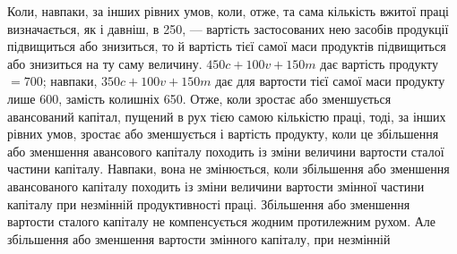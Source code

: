 Коли, навпаки, за інших рівних умов, коли, отже, та сама кількість
вжитої праці визначається, як і давніш, в 250, — вартість застосованих нею
засобів продукції підвищиться або знизиться, то й вартість тієї самої маси продуктів
підвищиться або знизиться на ту саму величину. $450 c + 100v + 150  m$
дає вартість продукту $= 700$; навпаки, $350 c + 100 v + 150 m$ дає для вартости
тієї самої маси продукту лише 600, замість колишніх 650. Отже, коли зростає
або зменшується авансований капітал, пущений в рух тією самою кількістю
праці, тоді, за інших рівних умов, зростає або зменшується і вартість продукту,
коли це збільшення або зменшення авансового капіталу походить із зміни
величини вартости сталої частини капіталу. Навпаки, вона не змінюється, коли
збільшення або зменшення авансованого капіталу походить із зміни величини
вартости змінної частини капіталу при незмінній продуктивності праці. Збільшення
або зменшення вартости сталого капіталу не компенсується жодним протилежним
рухом. Але збільшення або зменшення вартости змінного капіталу, при незмінній
\parbreak{}  %

